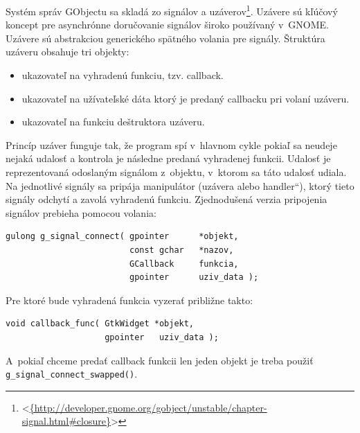 \documentclass[12pt,oneside,final]{fithesis2}
\newcommand\uv[1]{\quotedblbase #1\textquotedblleft}%
\begin{document}
Systém správ GObjectu sa skladá zo signálov a uzáverov\footnote{<\url{{http://developer.gnome.org/gobject/unstable/chapter-signal.html\#closure}}>}. Uzávere sú kľúčový koncept pre asynchrónne doručovanie signálov široko používaný v~GNOME. Uzávere sú abstrakciou generického spätného volania pre signály. Štruktúra uzáveru obsahuje tri objekty:
\begin{itemize}
\item ukazovateľ na vyhradenú funkciu, tzv. callback.
\item ukazovateľ na užívateľské dáta ktorý je predaný callbacku pri volaní uzáveru.
\item ukazovateľ na funkciu deštruktora uzáveru.
\end{itemize}
Princíp uzáver funguje tak, že program spí v~hlavnom cykle pokiaľ sa neudeje nejaká udalosť a kontrola je následne predaná vyhradenej funkcii. Udalosť je reprezentovaná odoslaným signálom z~objektu, v~ktorom sa táto udalosť udiala. Na jednotlivé signály sa pripája manipulátor (uzávera alebo \uv{handler}), ktorý tieto signály odchytí a zavolá vyhradenú funkciu. Zjednodušená verzia pripojenia signálov prebieha pomocou volania:
\begin{verbatim}
gulong g_signal_connect( gpointer      *objekt,
                         const gchar   *nazov,
                         GCallback     funkcia,
                         gpointer      uziv_data );
\end{verbatim} Pre ktoré bude vyhradená funkcia vyzerať približne takto: 
\begin{verbatim}
void callback_func( GtkWidget *objekt,
                    gpointer   uziv_data );
\end{verbatim}
A~pokiaľ chceme predať callback funkcii len jeden objekt je treba použiť \texttt{g\_signal\_connect\_swapped()}.
\end{document}
